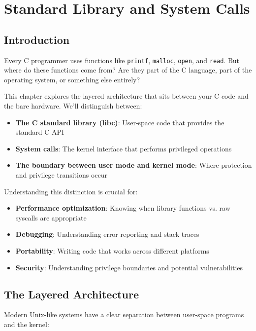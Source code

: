 \chapter{Standard Library and System Calls}

\section{Introduction}

Every C programmer uses functions like \texttt{printf}, \texttt{malloc}, \texttt{open}, and \texttt{read}. But where do these functions come from? Are they part of the C language, part of the operating system, or something else entirely?

This chapter explores the layered architecture that sits between your C code and the bare hardware. We'll distinguish between:
\begin{itemize}
    \item \textbf{The C standard library (libc)}: User-space code that provides the standard C API
    \item \textbf{System calls}: The kernel interface that performs privileged operations
    \item \textbf{The boundary between user mode and kernel mode}: Where protection and privilege transitions occur
\end{itemize}

Understanding this distinction is crucial for:
\begin{itemize}
    \item \textbf{Performance optimization}: Knowing when library functions vs. raw syscalls are appropriate
    \item \textbf{Debugging}: Understanding error reporting and stack traces
    \item \textbf{Portability}: Writing code that works across different platforms
    \item \textbf{Security}: Understanding privilege boundaries and potential vulnerabilities
\end{itemize}

\section{The Layered Architecture}

Modern Unix-like systems have a clear separation between user-space programs and the kernel:

